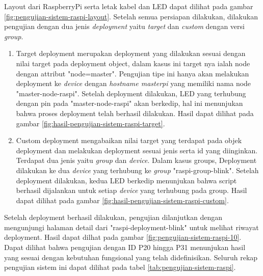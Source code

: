 Layout dari RaspberryPi serta letak kabel dan LED dapat dilihat pada gambar \ref{fig:pengujian-sistem-raspi-layout}. Setelah semua persiapan dilakukan, dilakukan pengujian dengan dua jenis \textit{deployment} yaitu \textit{target} dan \textit{custom} dengan versi \textit{group}.
\begin{enumerate}
  \item Target deployment merupakan deployment yang dilakukan sesuai dengan nilai target pada deployment object, dalam kasus ini target nya ialah node dengan attribut "node=master". Pengujian tipe ini hanya akan melakukan deployment ke \textit{device} dengan \textit{hostname masterpi} yang memiliki nama node "master-node-raspi". Setelah deployment dilakukan, LED yang terhubung dengan pin pada "master-node-raspi" akan berkedip, hal ini menunjukan bahwa proses deployment telah berhasil dilakukan. Hasil dapat dilihat pada gambar \ref{fig:hasil-pengujian-sistem-raspi-target}.
  \item Custom deployment mengabaikan nilai target yang terdapat pada objek deployment dan melakukan deployment sesuai jenis serta id yang diinginkan. Terdapat dua jenis yaitu \textit{group} dan \textit{device}. Dalam kasus groups, Deployment dilakukan ke dua \textit{device} yang terhubung ke \textit{group} "raspi-group-blink". Setelah deployment dilakukan, kedua LED berkedip menunjukan bahwa script berhasil dijalankan untuk setiap \textit{device} yang terhubung pada group. Hasil dapat dilihat pada gambar \ref{fig:hasil-pengujian-sistem-raspi-custom}.
\end{enumerate}

Setelah deployment berhasil dilakukan, pengujian dilanjutkan dengan mengunjungi halaman detail dari "raspi-deployment-blink" untuk melihat riwayat deployment. Hasil dapat dilhat pada gambar \ref{fig:pengujian-sistem-raspi-10}. Dapat dilihat bahwa pengujian dengan ID P20 hingga P31 menunjukan hasil yang sesuai dengan kebutuhan fungsional yang telah didefinisikan. Seluruh rekap pengujian sistem ini dapat dilihat pada tabel \ref{tab:pengujian-sistem-raspi}.
